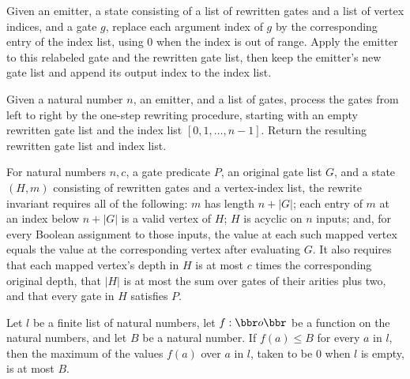 \begin{definition}
\label{BoolCircuit.rewriteStep}
\leanok
{}
Given an emitter, a state consisting of a list of rewritten gates and a list of vertex
indices, and a gate $g$, replace each argument index of $g$ by the corresponding entry
of the index list, using $0$ when the index is out of range. Apply the emitter to this
relabeled gate and the rewritten gate list, then keep the emitter's new gate list and
append its output index to the index list.
\end{definition}

\begin{definition}
\label{BoolCircuit.rewriteGates}
\leanok
{}
Given a natural number $n$, an emitter, and a list of gates, process the gates from left
to right by the one-step rewriting procedure, starting with an empty rewritten gate list
and the index list $[0,1,\ldots,n-1]$. Return the resulting rewritten gate list and
index list.
\end{definition}

\begin{definition}
\label{BoolCircuit.RewriteInv}
\leanok
{}
For natural numbers $n,c$, a gate predicate $P$, an original gate list $G$, and a state
$(H,m)$ consisting of rewritten gates and a vertex-index list, the rewrite invariant
requires all of the following: $m$ has length $n+|G|$; each entry of $m$ at an index
below $n+|G|$ is a valid vertex of $H$; $H$ is acyclic on $n$ inputs; and, for every
Boolean assignment to those inputs, the value at each such mapped vertex equals the
value at the corresponding vertex after evaluating $G$. It also requires that each
mapped vertex's depth in $H$ is at most $c$ times the corresponding original depth, that
$|H|$ is at most the sum over gates of their arities plus two, and that every gate in
$H$ satisfies $P$.
\end{definition}

\begin{theorem}
\label{BoolCircuit.foldr_max_le'}
\leanok
{}
Let $l$ be a finite list of natural numbers, let $f:\bbr	o\bbr$ be a function on the
natural numbers, and let $B$ be a natural number. If $f(a)\le B$ for every $a$ in $l$,
then the maximum of the values $f(a)$ over $a$ in $l$, taken to be $0$ when $l$ is
empty, is at most $B$.
\end{theorem}

